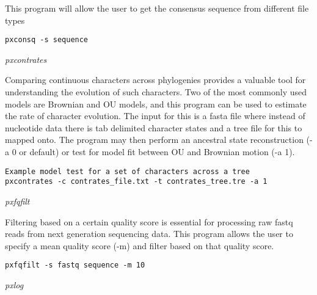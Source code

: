 \documentclass[12pt,letterpaper]{article}
\renewcommand{\subsection}[1]{%
\bigskip
\begin{center}
\begin{large}
\normalfont\itshape #1
\end{large}
\end{center}}
\begin{document}
This program will allow the user to get the consensus sequence from different file types

\begin{flushleft}
\begin{verbatim}
pxconsq -s sequence
\end{verbatim}
\end{flushleft}

\subsection{pxcontrates}

Comparing continuous characters across phylogenies provides a valuable tool for understanding the evolution of such characters. Two of the most commonly used models are Brownian and OU models, and this program can be used to estimate the rate of character evolution. The input for this is a fasta file where instead of nucleotide data there is tab delimited character states and a tree file for this to mapped onto. The program may then perform an ancestral state reconstruction (-a 0 or default) or test for model fit between OU and Brownian motion (-a 1).

\begin{flushleft}
\begin{verbatim}
Example model test for a set of characters across a tree
pxcontrates -c contrates_file.txt -t contrates_tree.tre -a 1
\end{verbatim}
\end{flushleft}

\subsection{pxfqfilt}

Filtering based on a certain quality score is essential for processing raw fastq reads from next generation sequencing data. This program allows the user to specify a mean quality score (-m) and filter based on that quality score.

\begin{flushleft}
\begin{verbatim}
pxfqfilt -s fastq sequence -m 10
\end{verbatim}
\end{flushleft}

\subsection{pxlog}
\end{document}
